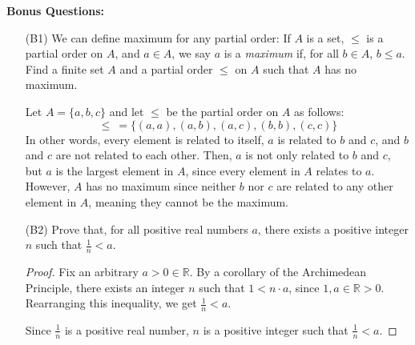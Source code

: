 \documentclass{article}
\begin{document}
    \newpage
    \textbf{Bonus Questions:}
    
    \begin{itemize}

        \item [(B1)] We can define maximum for any partial order: If $A$ is a set, $\leq$ is a partial order on $A$, and $a \in A$, we say $a$ is a \emph{maximum} if, for all $b \in A$, $b \le a$.  Find a finite set $A$ and a partial order $\leq$ on $A$ such that $A$ has no maximum.\\\par\quad
            Let $A = \{ a, b, c \}$ and let $\le$ be the partial order on $A$ as follows:
                \[
                    \le \ = \{ (a, a), (a, b), (a, c), (b, b), (c, c) \}
                \]
            In other words, every element is related to itself, $a$ is related to $b$ and $c$, and $b$ and $c$ are not related to each other. Then, $a$ is not only related to $b$ and $c$, but $a$ is the largest element in $A$, since every element in $A$ relates to $a$. However, $A$ has no maximum since neither $b$ nor $c$ are related to any other element in $A$, meaning they cannot be the maximum. 

        \item [(B2)] Prove that, for all positive real numbers $a$, there exists a positive integer $n$ such that $\frac{1}{n} < a$.
            \begin{proof}
                Fix an arbitrary $a > 0 \in\mathbb{R}$. By a corollary of the Archimedean Principle, there exists an integer $n$ such that $1 < n\cdot a$, since $1, a \in\mathbb{R} > 0$. Rearranging this inequality, we get $\frac{1}{n} < a$. \par

                Since $\frac{1}{n}$ is a positive real number, $n$ is a positive integer such that $\frac{1}{n} < a$.
            \end{proof}
    \end{itemize}
\end{document}
